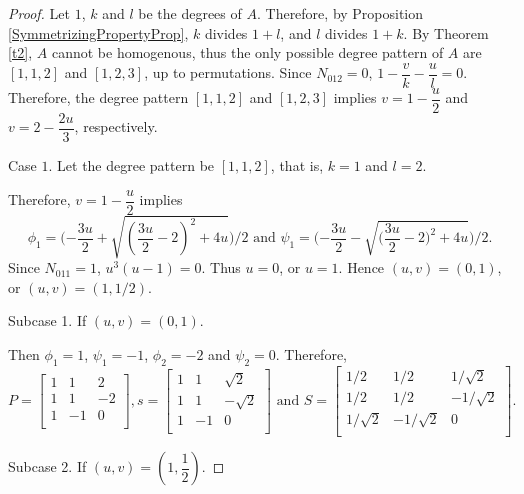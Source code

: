 \documentclass[12pt]{amsart}
\begin{document}
\begin{proof}
Let $1$, $k$ and $l$ be the degrees of $A$. Therefore, by Proposition \ref{SymmetrizingPropertyProp}, $k$ divides $1+l$, and $l$ divides $1+k$. By Theorem \ref{t2}, $A$ cannot be homogenous, thus the only possible  degree pattern of $A$ are $[1,1,2]$ and $[1,2,3]$, up to permutations.
Since $N_{012}=0$, $1-\dfrac{v}{k}-\dfrac{u}{l}=0$. Therefore, the degree pattern $[1,1,2]$ and $[1,2,3]$ implies $v=1-\dfrac{u}{2}$ and $v=2-\dfrac{2u}{3}$, respectively.

\smallskip

Case $1$. Let the degree pattern be $[1,1,2]$, that is, $k=1$ and $l=2$.

Therefore, $v=1-\dfrac{u}2 $ implies
$$\phi_1=\big({-\dfrac{3u}2+\sqrt{(\dfrac{3u}2-2)^2+4u}}\big)/{2} \mbox{ and } \psi_1=({-\dfrac{3u}2-\sqrt{\big(\dfrac{3u}2-2)^2+4u}}\big)/{2}.$$
Since $N_{011}=1$, $u^3(u-1)=0$. Thus $u=0$, or  $u=1$. Hence $(u,v)=(0,1)$, or $(u,v)=(1,1/2)$.

\smallskip

Subcase 1. If $(u,v)=(0,1)$.

Then $\phi_1=1$, $\psi_1=-1$, $\phi_2=-2$ and $\psi_2=0$. Therefore,
$$P=\left[
   \begin{array}{ccc}
     1 & 1 & 2 \\
     1 & 1 & -2\\
     1 & -1 & 0 \\
   \end{array}
 \right],
s=\left[
   \begin{array}{ccc}
     1 & 1 & \sqrt2 \\
     1 & 1 & -\sqrt2\\
     1 & -1 & 0 \\
   \end{array}
 \right] \mbox{ and } S=\left[
   \begin{array}{ccc}
     1/2 & 1/2 & 1/\sqrt2 \\
     1/2 & 1/2 & -1/\sqrt2\\
     1/\sqrt2 & -1/\sqrt2 & 0 \\
   \end{array}
 \right].
$$

Subcase 2. If $(u,v)=(1,\dfrac12)$.


\end{proof}
\end{document}
